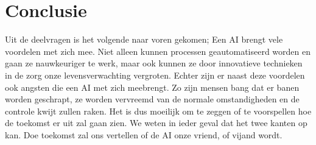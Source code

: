 \documentclass{article}
\begin{document}
\section{Conclusie}
Uit de deelvragen is het volgende naar voren gekomen; Een AI brengt vele voordelen met zich mee. Niet alleen kunnen processen geautomatiseerd worden en gaan ze nauwkeuriger te werk, maar ook kunnen ze door innovatieve technieken in de zorg onze levensverwachting vergroten. Echter zijn er naast deze voordelen ook angsten die een AI met zich meebrengt. Zo zijn mensen bang dat er banen worden geschrapt, ze worden vervreemd van de normale omstandigheden en de controle kwijt zullen raken. Het is dus moeilijk om te zeggen of te voorspellen hoe de toekomst er uit zal gaan zien. We weten
in ieder geval dat het twee kanten op kan. Doe toekomst zal ons vertellen of de AI onze vriend, of vijand wordt. 

\newpage
\nocite{robotsamenleving,vriendofvijand,arbeidsmarkt,breinoverbodig,stephenhawking,killemachine,uitgeroeid,autonomous,benificialai,pastandfuture,computerziekenhuis}


% 
% 
\end{document}
